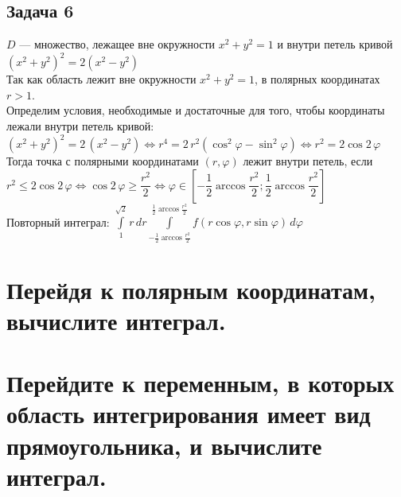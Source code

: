 \documentclass[a4paper, fleqn]{article}
\begin{document}
    
    \subsection*{Задача 6}
    $D$ --- множество, лежащее вне окружности $x^2 + y^2 = 1$ и внутри петель кривой $(x^2 + y^2)^2 = 2(x^2 - y^2)$ \\[5 pt]
    Так как область лежит вне окружности $x^2 + y^2 = 1$, в полярных координатах $r > 1$. \\[3 pt]
    Определим условия, необходимые и достаточные для того, чтобы координаты лежали внутри петель кривой: \\[3 pt]
    $(x^2 + y^2)^2 = 2\, (x^2 - y^2) \Leftrightarrow r^4 = 2\, r^2 (\cos^2 \varphi - \sin^2 \varphi)
     \Leftrightarrow r^2 = 2 \cos 2\, \varphi$ \\[5 pt]
     Тогда точка с полярными координатами $(r, \varphi)$ лежит внутри петель, если 
     $r^2 \le 2 \cos 2\, \varphi \Leftrightarrow \cos 2\, \varphi \ge \dfrac{r^2}2 \Leftrightarrow 
     \varphi \in \left[ -\dfrac12\arccos \dfrac{r^2}2; \dfrac12\arccos \dfrac{r^2}2 \right]$ \\
     Повторный интеграл:
     $\int\limits_{1}^{\sqrt2} r\, dr \int\limits_{-\frac12\arccos \frac{r^2}2}^{\frac12\arccos \frac{r^2}2} f(r \cos \varphi, r \sin \varphi)\, d\varphi$
    
    \section*{Перейдя к полярным координатам, вычислите интеграл.}
    
    
    \section*{Перейдите к переменным, в которых область интегрирования имеет вид прямоугольника, 
    и вычислите интеграл.}
    
\end{document}
